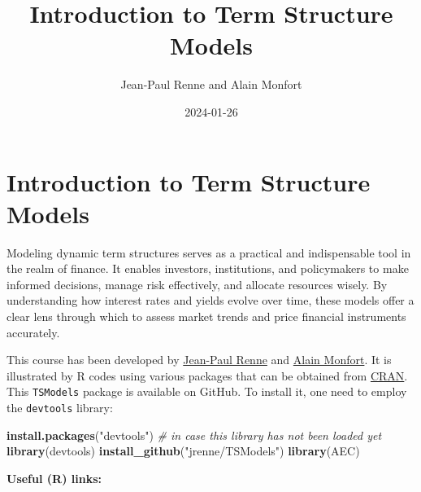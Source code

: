 \documentclass[
  12pt,
]{book}
\title{Introduction to Term Structure Models}
\author{Jean-Paul Renne and Alain Monfort}
\date{2024-01-26}
\newenvironment{Shaded}{\begin{snugshade}}{\end{snugshade}}
\newcommand{\CommentTok}[1]{\textcolor[rgb]{0.56,0.35,0.01}{\textit{#1}}}
\newcommand{\FunctionTok}[1]{\textcolor[rgb]{0.13,0.29,0.53}{\textbf{#1}}}
\newcommand{\NormalTok}[1]{#1}
\newcommand{\StringTok}[1]{\textcolor[rgb]{0.31,0.60,0.02}{#1}}
\theoremstyle{definition}
\theoremstyle{definition}
\theoremstyle{definition}
\theoremstyle{definition}
\theoremstyle{remark}
\begin{document}
\maketitle

{
\setcounter{tocdepth}{1}
\tableofcontents
}
\newcommand{\bv}[1]{\mathbf{#1}}

\hypertarget{intro}{%
\chapter*{Introduction to Term Structure Models}\label{intro}}

Modeling dynamic term structures serves as a practical and indispensable tool in the realm of finance. It enables investors, institutions, and policymakers to make informed decisions, manage risk effectively, and allocate resources wisely. By understanding how interest rates and yields evolve over time, these models offer a clear lens through which to assess market trends and price financial instruments accurately.

This course has been developed by \href{https://sites.google.com/site/jeanpaulrenne/home}{Jean-Paul Renne} and \href{https://faculty.crest.fr/amonfort/}{Alain Monfort}. It is illustrated by R codes using various packages that can be obtained from \href{https://cran.r-project.org}{CRAN}. This \texttt{TSModels} package is available on GitHub. To install it, one need to employ the \texttt{devtools} library:

\begin{Shaded}
\begin{Highlighting}[]
\FunctionTok{install.packages}\NormalTok{(}\StringTok{"devtools"}\NormalTok{) }\CommentTok{\# in case this library has not been loaded yet}
\FunctionTok{library}\NormalTok{(devtools)}
\FunctionTok{install\_github}\NormalTok{(}\StringTok{"jrenne/TSModels"}\NormalTok{)}
\FunctionTok{library}\NormalTok{(AEC)}
\end{Highlighting}
\end{Shaded}

\textbf{Useful (R) links:}
\end{document}
